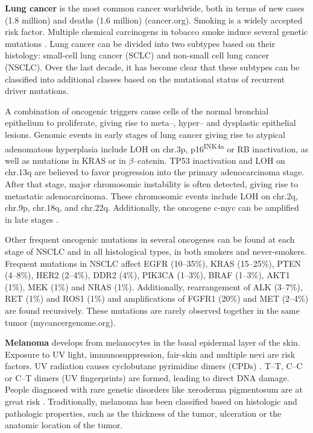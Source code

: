 {{{    \textbf{Lung cancer} is the most common cancer worldwide, both in terms of
    new cases (1.8 million) and deaths (1.6 million) (cancer.org). Smoking is a
    widely accepted risk factor. Multiple chemical carcinogens in tobacco smoke
    induce several genetic mutations {\cite{smoking_cancer}}. Lung cancer can
    be divided into two subtypes based on their histology: small-cell lung cancer (SCLC)
    and non-small cell lung cancer (NSCLC). Over the last decade, it has become
    clear that these subtypes can be classified into  additional classes based
    on the mutational status of recurrent driver mutations.

    A combination of oncogenic triggers cause cells of the normal bronchial
    epithelium to proliferate, giving rise to meta--, hyper-- and dysplastic
    epithelial lesions. Genomic events in early stages of lung cancer giving
    rise to atypical adenomatous hyperplasia include LOH on chr.3p,
    p16\textsuperscript{INK4a} or RB inactivation, as well as mutations in KRAS
    or in $\beta$--catenin. TP53 inactivation and LOH on chr.13q are believed to
    favor progression into the primary adenocarcinoma stage. After that stage,
    major chromosomic instability is often detected, giving rise to metastatic
    adenocarcinoma. These chromosomic events include LOH on chr.2q, chr.9p,
    chr.18q, and chr.22q. Additionally, the oncogene c-myc can be amplified in
    late stages {\cite{nsclc}}.

    Other frequent oncogenic mutations in several oncogenes
    can be found at each stage of NSCLC and in all histological types, in both
    smokers and never-smokers. Frequent mutations in NSCLC affect
    EGFR (10--35\%), KRAS (15--25\%), PTEN (4--8\%), HER2 (2--4\%), DDR2
    (4\%), PIK3CA (1--3\%), BRAF (1--3\%), AKT1 (1\%), MEK (1\%) and NRAS
    (1\%). Additionally, rearrangement of ALK (3--7\%), RET (1\%) and ROS1
    (1\%) and amplifications of FGFR1 (20\%) and MET (2--4\%) are found
    recursively. These mutations are rarely observed together in the same
    tumor (mycancergenome.org).

    \textbf{Melanoma} develops from melanocytes
    in the basal epidermal layer of the skin. Exposure to UV light,
    immunosuppression, fair-skin and multiple nevi are risk factors. UV
    radiation causes cyclobutane pyrimidine dimers (CPDs) {\cite{melanoma_3}}.
    T--T, C--C or C--T dimers (UV fingerprints) are formed, leading to direct
    DNA damage. People diagnosed with rare genetic disorders like xeroderma
    pigmentosum are at great risk {\cite{xero}}. Traditionally, melanoma has
    been classified based on histologic and pathologic properties, such as
    the thickness of the tumor, ulceration or the anatomic location of the
    tumor.

}}}
